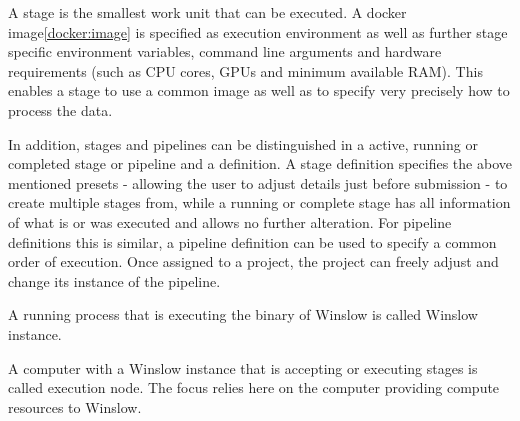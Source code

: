 A stage is the smallest work unit that can be executed.
A docker image\autoref{docker:image} is specified as execution environment as well as further stage specific environment variables, command line arguments and hardware requirements (such as CPU cores, GPUs and minimum available RAM).
This enables a stage to use a common image as well as to specify very precisely how to process the data.

In addition, stages and pipelines can be distinguished in a active, running or completed stage or pipeline and a definition.
A stage definition specifies the above mentioned presets - allowing the user to adjust details just before submission - to create multiple stages from, while a running or complete stage has all information of what is or was executed and allows no further alteration.
For pipeline definitions this is similar, a pipeline definition can be used to specify a common order of execution.
Once assigned to a project, the project can freely adjust and change its instance of the pipeline.

A running process that is executing the binary of Winslow is called Winslow instance.

A computer with a Winslow instance that is accepting or executing stages is called execution node.
The focus relies here on the computer providing compute resources to Winslow.


